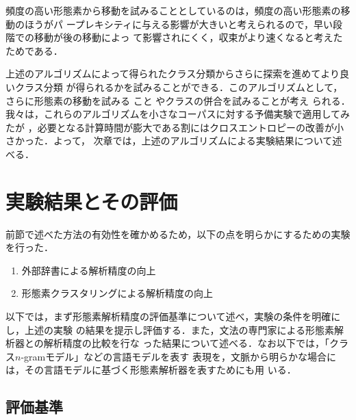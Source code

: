 頻度の高い形態素から移動を試みることとしているのは，頻度の高い形態素の移動のほうがパ
ープレキシティに与える影響が大きいと考えられるので，早い段階での移動が後の移動によっ
て影響されにくく，収束がより速くなると考えたためである．

上述のアルゴリズムによって得られたクラス分類からさらに探索を進めてより良いクラス分類
が得られるかを試みることができる．このアルゴリズムとして，さらに形態素の移動を試みる
こと\cite{On.Structuring.Probabilistic.Dependences.in.Stochastic.Language.Modeling}
やクラスの併合を試みること\cite{Class-Based.n-gram.Models.of.Natural.Language}が考え
られる．我々は，これらのアルゴリズムを小さなコーパスに対する予備実験で適用してみたが
，必要となる計算時間が膨大である割にはクロスエントロピーの改善が小さかった．よって，
次章では，上述のアルゴリズムによる実験結果について述べる．







\section{実験結果とその評価}

前節で述べた方法の有効性を確かめるため，以下の点を明らかにするための実験を行った．
\begin{enumerate}
\item 外部辞書による解析精度の向上
\item 形態素クラスタリングによる解析精度の向上
\end{enumerate}
以下では，まず形態素解析精度の評価基準について述べ，実験の条件を明確にし，上述の実験
の結果を提示し評価する．また，文法の専門家による形態素解析器との解析精度の比較を行な
った結果について述べる．なお以下では，「クラス$n$-gramモデル」などの言語モデルを表す
表現を，文脈から明らかな場合には，その言語モデルに基づく形態素解析器を表すためにも用
いる．



\subsection{評価基準}

